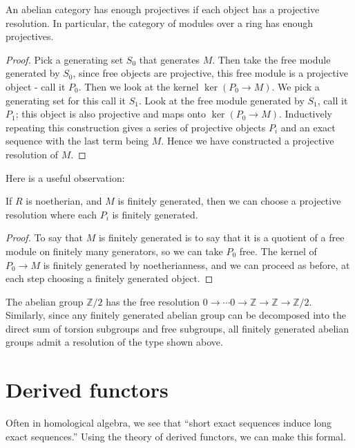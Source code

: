 \begin{theorem}An abelian category has enough projectives if
each object has a
projective resolution. In particular, the category of modules
over a ring has
enough projectives. \end{theorem}
\begin{proof} Pick a generating set $S_0$ that generates $M$.
Then take the free
module generated by $S_0$, since free objects are projective,
this free module
is a projective object - call it $P_0$. Then we look at the
kernel
$\ker(P_0\rightarrow M)$. We pick a generating set for this call
it $S_1$. Look
at the free module generated by $S_1$, call it $P_1$; this
object is also
projective and maps onto $\ker(P_0\rightarrow M)$. Inductively
repeating this
construction gives a series of projective objects $P_i$ and an
exact sequence
with the last term being $M$. Hence we have constructed a
projective resolution
of $M$. \end{proof}

Here is a useful observation:
\begin{proposition}
If $R$ is noetherian, and $M$ is finitely generated, then we can
choose a
projective resolution where each $P_i$ is finitely generated.
\end{proposition}
\begin{proof}
To say that $M$ is finitely generated is to say that it is a
quotient of a free module on
finitely many generators, so we can take $P_0$ free. The kernel
of $P_0 \to M$
is finitely generated by noetherianness, and we can proceed as
before, at each step
choosing a finitely generated object.
\end{proof}
\begin{example} The abelian group $\mathbb{Z}/2$ has the free
resolution $0\rightarrow\cdots
0\rightarrow\mathbb{Z}\rightarrow\mathbb{Z}\rightarrow\mathbb{Z}/2$.
Similarly, since any finitely generated abelian group can be
decomposed into the direct sum of torsion subgroups and free
subgroups, all finitely generated abelian groups admit a
resolution of the type shown above.\end{example}

\section{Derived functors}
Often in homological algebra, we see that ``short exact
sequences induce long exact sequences.'' Using the theory of
derived functors, we can make this formal.

